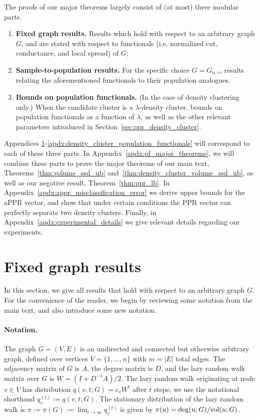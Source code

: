 \noindent The proofs of our major theorems largely consist of (at most) three modular parts.
\begin{enumerate}
	\item \textbf{Fixed graph results.} Results which hold with respect to an arbitrary graph $G$, and are stated with respect to functionals (i.e. normalized cut, conductance, and local spread) of $G$;
	\item \textbf{Sample-to-population results.} For the specific choice $G = G_{n,r}$, results relating the aforementioned functionals to their population analogues. 
	\item \textbf{Bounds on population functionals.} (In the case of density clustering only.) When the candidate cluster is a $\lambda$-density cluster, bounds on population functionals as a function of $\lambda$, as well as the other relevant parameters introduced in Section~\ref{sec:ppr_density_cluster}.
\end{enumerate}

Appendices \ref{apdx:fixed_graph}-\ref{apdx:density_cluster_population_functionals} will correspond to each of these three parts. In Appendix~\ref{apdx:pf_major_theorems}, we will combine these parts to prove the major theorems of our main text, Theorems~\ref{thm:volume_ssd_ub} and~\ref{thm:density_cluster_volume_ssd_ub}, as well as our negative result, Theorem~\ref{thm:ppr_lb}. In Appendix~\ref{apdx:appr_misclassification_error} we derive upper bounds for the aPPR vector, and show that under certain conditions the PPR vector can perfectly separate two density clusters. Finally, in Appendix~\ref{apdx:experimental_details} we give relevant details regarding our experiments.

\section{Fixed graph results}
\label{apdx:fixed_graph}
In this section, we give all results that hold with respect to an arbitrary graph $G$. For the convenience of the reader, we begin by reviewing some notation from the main text, and also introduce some new notation. 

\paragraph{Notation.}
The graph $G = (V,E)$ is an undirected and connected but otherwise arbitrary graph, defined over vertices $V = \{1,\ldots,n\}$ with $m = |E|$ total edges. The adjacency matrix of $G$ is $A$, the degree matrix is $D$, and the lazy random walk matrix over $G$ is $W = (I + D^{-1}A)/2$. The lazy random walk originating at node $v \in V$ has distribution $q(v,t;G) = e_vW^t$ after $t$ steps; we use the notational shorthand $q_v^{(t)} := q(v,t;G)$. The stationary distribution of the lazy random walk is $\pi := \pi(G) := \lim_{t \to \infty} q_v^{(t)}$ is given by $\pi(u) = \deg(u;G)/\mathrm{vol}(u;G)$.

